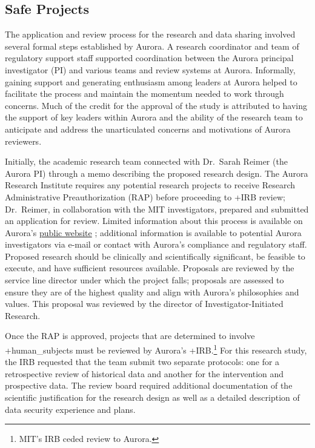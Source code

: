 \documentclass[
]{book}
\begin{document}
\hypertarget{safe-projects-4}{%
\subsection{Safe Projects}\label{safe-projects-4}}

The application and review process for the research and data sharing involved several formal steps established by Aurora. A research coordinator and team of regulatory support staff supported coordination between the Aurora principal investigator (PI) and various teams and review systems at Aurora. Informally, gaining support and generating enthusiasm among leaders at Aurora helped to facilitate the process and maintain the momentum needed to work through concerns. Much of the credit for the approval of the study is attributed to having the support of key leaders within Aurora and the ability of the research team to anticipate and address the unarticulated concerns and motivations of Aurora reviewers.

Initially, the academic research team connected with Dr.~Sarah Reimer (the Aurora PI) through a memo describing the proposed research design. The Aurora Research Institute requires any potential research projects to receive Research Administrative Preauthorization (RAP) before proceeding to +IRB\textbar{} review; Dr.~Reimer, in collaboration with the MIT investigators, prepared and submitted an application for review. Limited information about this process is available on Aurora's \href{https://www.aurorahealthcare.org/aurora-research-institute/researcher-resources/research-administrative-preauthorization\#Overview}{public website} \citep{aurorahealthcare}; additional information is available to potential Aurora investigators via e-mail or contact with Aurora's compliance and regulatory staff. Proposed research should be clinically and scientifically significant, be feasible to execute, and have sufficient resources available. Proposals are reviewed by the service line director under which the project falls; proposals are assessed to ensure they are of the highest quality and align with Aurora's philosophies and values. This proposal was reviewed by the director of Investigator-Initiated Research.

Once the RAP is approved, projects that are determined to involve +human\_subjects\textbar{} must be reviewed by Aurora's +IRB\textbar.\footnote{MIT's IRB ceded review to Aurora.} For this research study, the IRB requested that the team submit two separate protocols: one for a retrospective review of historical data and another for the intervention and prospective data. The review board required additional documentation of the scientific justification for the research design as well as a detailed description of data security experience and plans.
\end{document}

